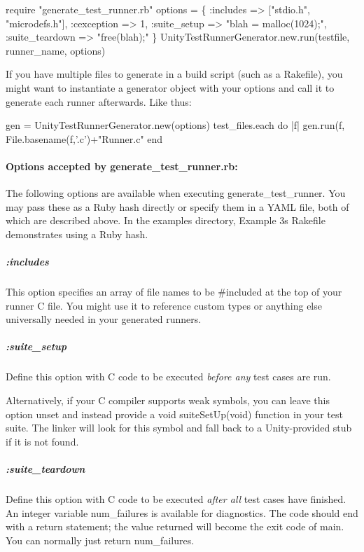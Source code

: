 \begin{DoxyCode}
require "generate\_test\_runner.rb"
options = \{
  :includes => ["stdio.h", "microdefs.h"],
  :cexception => 1,
  :suite\_setup => "blah = malloc(1024);",
  :suite\_teardown => "free(blah);"
\}
UnityTestRunnerGenerator.new.run(testfile, runner\_name, options)
\end{DoxyCode}


If you have multiple files to generate in a build script (such as a Rakefile), you might want to instantiate a generator object with your options and call it to generate each runner afterwards. Like thus\+:


\begin{DoxyCode}
gen = UnityTestRunnerGenerator.new(options)
test\_files.each do |f|
  gen.run(f, File.basename(f,'.c')+"Runner.c"
end
\end{DoxyCode}


\paragraph*{Options accepted by generate\+\_\+test\+\_\+runner.\+rb\+:}

The following options are available when executing {\ttfamily generate\+\_\+test\+\_\+runner}. You may pass these as a Ruby hash directly or specify them in a Y\+A\+ML file, both of which are described above. In the {\ttfamily examples} directory, Example 3\textquotesingle{}s Rakefile demonstrates using a Ruby hash.

\subparagraph*{{\ttfamily \+:includes}}

This option specifies an array of file names to be {\ttfamily \#include}\textquotesingle{}d at the top of your runner C file. You might use it to reference custom types or anything else universally needed in your generated runners.

\subparagraph*{{\ttfamily \+:suite\+\_\+setup}}

Define this option with C code to be executed {\itshape before any} test cases are run.

Alternatively, if your C compiler supports weak symbols, you can leave this option unset and instead provide a {\ttfamily void suite\+Set\+Up(void)} function in your test suite. The linker will look for this symbol and fall back to a Unity-\/provided stub if it is not found.

\subparagraph*{{\ttfamily \+:suite\+\_\+teardown}}

Define this option with C code to be executed {\itshape after all} test cases have finished. An integer variable {\ttfamily num\+\_\+failures} is available for diagnostics. The code should end with a {\ttfamily return} statement; the value returned will become the exit code of {\ttfamily main}. You can normally just return {\ttfamily num\+\_\+failures}.

